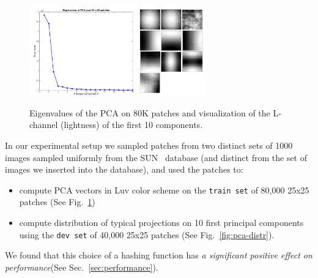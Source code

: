 \begin{figure}[ht!]
\includegraphics[width=3.0in]{fig_NN/principal_comps.png}
\label{fig:lambdas}
\caption{Eigenvalues of the PCA on 80K patches and visualization
of the L-channel (lightness) of the first 10 components.}
\end{figure}

In our experimental setup we sampled patches from two distinct
sets of 1000 images sampled uniformly from the SUN~\cite{SUN} database
(and distinct from the set of images we inserted into the database),
and used the patches to:
\begin{itemize}
\item compute PCA vectors in Luv color scheme on the \texttt{train{\allowbreak} set}
of 80,000 25x25 patches (See Fig.~\ref{fig:lambdas})
\item compute distribution of typical projections on 10
first principal components using the \texttt{dev{\allowbreak} set} of
40,000 25x25 patches (See Fig.~\ref{fig:pca-distr}).
\end{itemize}
We found that this choice of a hashing function has \emph{a
significant positive effect on performance}(See Sec.~\ref{sec:performance}).

